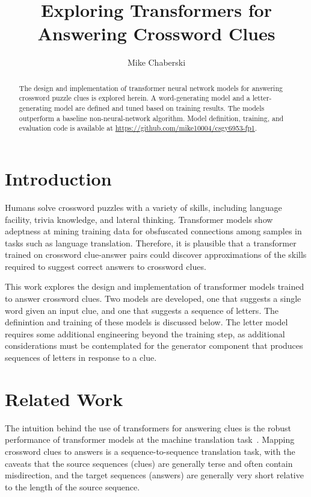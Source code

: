 \documentclass[letterpaper]{article} %
\title{Exploring Transformers for Answering Crossword Clues}
\author {
    Mike Chaberski
}
\begin{document}
\maketitle

\begin{abstract}
    The design and implementation of transformer neural network models for answering crossword puzzle clues is explored herein.
    A word-generating model and a letter-generating model are defined and tuned based on training results.
    The models outperform a baseline non-neural-network algorithm.
    Model definition, training, and evaluation code is available at \url{https://github.com/mike10004/csgy6953-fp1}.
\end{abstract}

\begin{NoHyper}

\section{Introduction}
\label{sec:intro}

Humans solve crossword puzzles with a variety of skills, including language facility, trivia knowledge, and lateral thinking.
Transformer models show adeptness at mining training data for obsfuscated connections among samples in tasks such as language translation.
Therefore, it is plausible that a transformer trained on crossword clue-answer pairs could discover approximations of the
skills required to suggest correct answers to crossword clues.

This work explores the design and implementation of transformer models trained to answer crossword clues.
Two models are developed, one that suggests a single word given an input clue, and one that suggests a
sequence of letters.
The definintion and training of these models is discussed below.
The letter model requires some additional engineering beyond the training step, as
additional considerations must be contemplated for the generator component that produces
sequences of letters in response to a clue.

\section{Related Work}
\label{sec:related}

The intuition behind the use of transformers for answering clues is the robust performance of transformer models at
the machine translation task~\cite{vaswani2017}.
Mapping crossword clues to answers is a sequence-to-sequence translation task, with the caveats that the source
sequences (clues) are generally terse and often contain misdirection, and the target sequences (answers) are
generally very short relative to the length of the source sequence.


\end{NoHyper}
\end{document}
